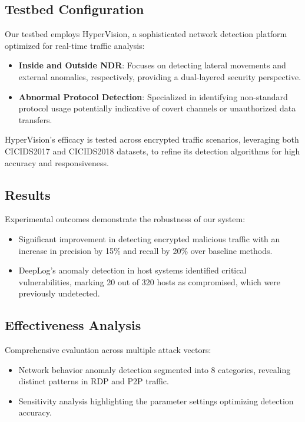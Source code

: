 \subsection{Testbed Configuration}\label{sec:testbed}
Our testbed employs HyperVision, a sophisticated network detection platform optimized for real-time traffic analysis:
\begin{itemize}
    \item \textbf{Inside and Outside NDR}: Focuses on detecting lateral movements and external anomalies, respectively, providing a dual-layered security perspective.
    \item \textbf{Abnormal Protocol Detection}: Specialized in identifying non-standard protocol usage potentially indicative of covert channels or unauthorized data transfers.
\end{itemize}

HyperVision's efficacy is tested across encrypted traffic scenarios, leveraging both CICIDS2017 and CICIDS2018 datasets, to refine its detection algorithms for high accuracy and responsiveness.

\subsection{Results}\label{sec:results}
Experimental outcomes demonstrate the robustness of our system:
\begin{itemize}
    \item Significant improvement in detecting encrypted malicious traffic with an increase in precision by 15\% and recall by 20\% over baseline methods.
    \item DeepLog's anomaly detection in host systems identified critical vulnerabilities, marking 20 out of 320 hosts as compromised, which were previously undetected.
\end{itemize}

\subsection{Effectiveness Analysis}\label{sec:effect}
Comprehensive evaluation across multiple attack vectors:
\begin{itemize}
    \item Network behavior anomaly detection segmented into 8 categories, revealing distinct patterns in RDP and P2P traffic.
    \item Sensitivity analysis highlighting the parameter settings optimizing detection accuracy.
\end{itemize}

